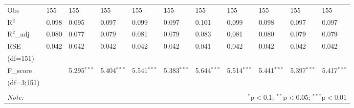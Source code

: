 \begin{table}[H]
\begin{tabularx}{\textwidth}{XXXXXXXXXXl}
Obs & 155 & 155 & 155 & 155 & 155 & 155 & 155 & 155 & 155 & 155 \\ 
R$^{2}$ & 0.098 & 0.095 & 0.097 & 0.099 & 0.097 & 0.101 & 0.099 & 0.098 & 0.097 & 0.097 \\ 
R$^{2}$_{adj} & 0.080 & 0.077 & 0.079 & 0.081 & 0.079 & 0.083 & 0.081 & 0.080 & 0.079 & 0.079 \\ 
RSE & 0.042 & 0.042 & 0.042 & 0.042 & 0.042 & 0.041 & 0.042 & 0.042 & 0.042 & 0.042 \\ 
(df=151)  & & & & & & & & & & \\
F_{score}  & {\footnotesize 5.448$^{***}$ & 5.295$^{***}$ & 5.404$^{***}$ & 5.541$^{***}$ & 5.383$^{***}$ & 5.644$^{***}$ & 5.514$^{***}$ & 5.441$^{***}$ & 5.397$^{***}$ & 5.417$^{***}$} \\ 
(df=3;151) & & & & & & & & & & \\
\hline 
\hline \\[-1.8ex] 
\textit{Note:}  & \multicolumn{10}{r}{$^{*}$p$<$0.1; $^{**}$p$<$0.05; $^{***}$p$<$0.01} \\ 
\end{tabularx} 
\end{table} 


